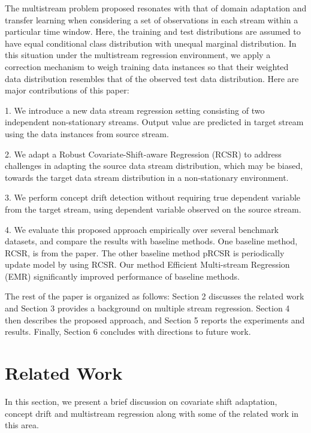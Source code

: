 \documentclass[conference,compsoc]{IEEEtran}
\begin{document}
  The multistream problem proposed resonates with that of domain adaptation\cite{Ben-David} and transfer learning\cite{Pan} when considering a set of observations in each stream within a particular time window. Here, the training and test distributions are assumed to have equal conditional class distribution  with  unequal  marginal distribution. In this situation under the multistream regression environment, we apply a correction mechanism to weigh training data instances so that their weighted data distribution resembles that of the observed test data distribution. Here are major contributions of this paper:
  
  1. We introduce a new data stream regression setting consisting of two independent non-stationary streams. Output value are predicted in target stream using the data instances from source stream. 
  
  2. We adapt a Robust Covariate-Shift-aware Regression (RCSR) to address challenges in adapting the source data stream distribution, which may be biased, towards the target data stream distribution in a non-stationary environment. 
  
  3. We perform concept drift detection without requiring true dependent variable from the target stream, using dependent variable observed on the source stream. 
  
  4. We evaluate this proposed approach empirically over several benchmark datasets, and compare the results with baseline methods. One baseline method, RCSR, is from the paper\cite{chen}. The other baseline method pRCSR is periodically update model by using RCSR. Our method Efficient Multi-stream Regression (EMR) significantly improved performance of baseline methods.
  
  The rest of the paper is organized as follows: Section 2 discusses the related work and Section 3 provides a background on multiple stream regression. Section 4 then describes the proposed approach, and Section 5 reports the experiments and results. Finally, Section 6 concludes with directions to future work.

\section{Related Work}
\label{notations}
In this section, we present a brief discussion on covariate shift adaptation, concept drift and multistream regression along with some of the related work in this area.
\end{document}
